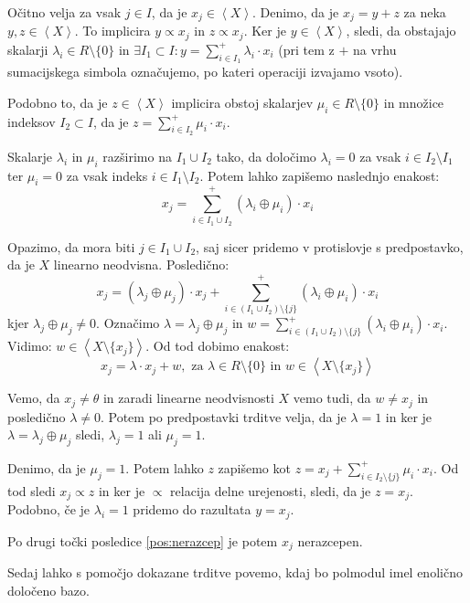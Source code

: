 \documentclass[mat1]{fmfdelo}
\newcommand{\Gen}[1]{\ensuremath{\left<{#1}\right>}}
\begin{document}
\begin{dokaz}
	Očitno velja za vsak $j\in I$, da je $x_j\in\Gen{X}$. Denimo, da je $x_j = y + z$ za neka $y, z\in\Gen{X}$. To implicira $y\varpropto x_j$ in $z\varpropto x_j$. 
	Ker je $y\in\Gen{X}$, sledi, da obstajajo skalarji $\lambda_i\in R\setminus\{0\}$ in $\exists I_1 \subset I: y = \sum_{i \in I_1}^{+}\lambda_i\cdot x_i$ (pri tem z $+$ na vrhu sumacijskega simbola označujemo, po kateri operaciji izvajamo vsoto). 
	
	Podobno to, da je $z\in\Gen{X}$ implicira obstoj skalarjev $\mu_i\in R\setminus\{0\}$ in množice indeksov $I_2\subset I$, da je $z = \sum_{i\in I_2}^{+}\mu_i\cdot x_i$. 
	
	Skalarje $\lambda_i$ in $\mu_i$ razširimo na $I_1\cup I_2$ tako, da določimo $\lambda_i = 0$ za vsak $i\in I_2\setminus I_1$ ter $\mu_i = 0$ za vsak indeks $i\in I_1\setminus I_2$. Potem lahko zapišemo naslednjo enakost: $$x_j = \sum_{i\in I_1\cup I_2}^{+}(\lambda_i \oplus\mu_i)\cdot x_i$$
	
	Opazimo, da mora biti $j\in I_1\cup I_2$, saj sicer pridemo v protislovje s predpostavko, da je $X$ linearno neodvisna. Posledično: $$ x_j = (\lambda_j\oplus\mu_j)\cdot x_j + \sum_{i\in (I_1\cup I_2)\setminus\{j\}}^{+}(\lambda_i\oplus\mu_i)\cdot x_i $$
	kjer $\lambda_j\oplus\mu_j\neq 0$. Označimo $\lambda = \lambda_j\oplus\mu_j$ in $w = \sum_{i\in (I_1\cup I_2)\setminus\{j\}}^{+}(\lambda_i\oplus\mu_i)\cdot x_i$. Vidimo: $w\in\Gen{X\setminus\{x_j\}}$. Od tod dobimo enakost: $$x_j = \lambda\cdot x_j + w,\text{~za~} \lambda\in R\setminus\{0\}\text{~in~} w\in\Gen{X\setminus\{x_j\}} $$
	
	Vemo, da $x_j\neq \theta$ in zaradi linearne neodvisnosti $X$ vemo tudi, da $w\neq x_j$ in posledično $\lambda\neq 0$. Potem po predpostavki trditve velja, da je $\lambda = 1$ in ker je $\lambda = \lambda_j\oplus\mu_j$ sledi, $\lambda_j = 1$ ali $\mu_j = 1$. 
	
	Denimo, da je $\mu_j = 1$. Potem lahko $z$ zapišemo kot $z = x_j + \sum_{i\in I_2\setminus\{j\}}^{+}\mu_i\cdot x_i$. Od tod sledi $x_j\varpropto z$ in ker je $\varpropto$ relacija delne urejenosti, sledi, da je $z = x_j$. Podobno, če je $\lambda_i = 1$ pridemo do razultata $y = x_j$.
	
	Po drugi točki posledice \ref{pos:nerazcep} je potem $x_j$ nerazcepen.
\end{dokaz}

Sedaj lahko s pomočjo dokazane trditve povemo, kdaj bo polmodul imel enolično določeno bazo.
\end{document}
